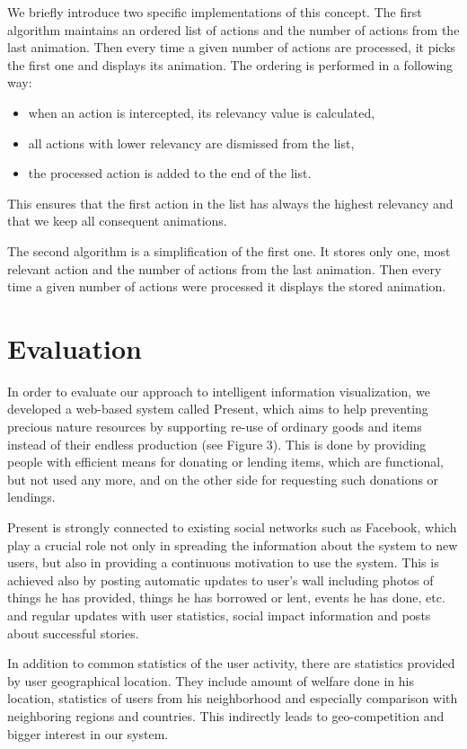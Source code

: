 \documentclass[10pt]{article}
\begin{document}
We briefly introduce two specific implementations of this concept. The first algorithm maintains an ordered list of actions and the number of actions from the last animation. Then every time a given number of actions are processed, it picks the first one and displays its animation.
The ordering is performed in a following way:

\begin{itemize}
\item{when an action is intercepted, its relevancy value is calculated,}
\item{all actions with lower relevancy are dismissed from the list,}
\item{the processed action is added to the end of the list.}
\end{itemize}
This ensures that the first action in the list has always the highest relevancy and that we keep all consequent animations.

The second algorithm is a simplification of the first one. It stores only one, most relevant action and the number of actions from the last animation. Then every time a given number of actions were processed it displays the stored animation.

\section{Evaluation}
In order to evaluate our approach to intelligent information visualization, we developed a web-based system called Present, which aims to help preventing precious nature resources by supporting re-use of ordinary goods and items instead of their endless production (see Figure 3). This is done by providing people with efficient means for donating or lending items, which are functional, but not used any more, and on the other side for requesting such donations or lendings.



Present is strongly connected to existing social networks such as Facebook, which play a crucial role not only in spreading the information about the system to new users, but also in providing a continuous motivation to use the system. This is achieved also by posting automatic updates to user's wall including photos of things he has provided, things he has borrowed or lent, events he has done, etc. and regular updates with user statistics, social impact information and posts about successful stories.

In addition to common statistics of the user activity, there are statistics provided by user geographical location. They include amount of welfare done in his location, statistics of users from his neighborhood and especially comparison with neighboring regions and countries. This indirectly leads to geo-competition and bigger interest in our system.
\end{document}
